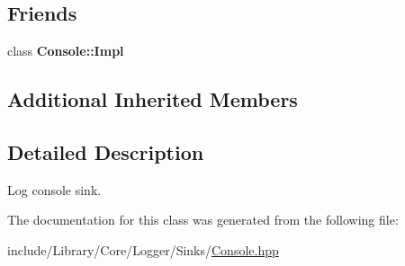 \subsection*{Friends}
\begin{DoxyCompactItemize}
\item 
\mbox{\label{classlibrary_1_1core_1_1logger_1_1sinks_1_1_console_aeda242f6bb74cf8f4003eb67666e9118}} 
class {\bfseries Console\+::\+Impl}
\end{DoxyCompactItemize}
\subsection*{Additional Inherited Members}


\subsection{Detailed Description}
Log console sink. 

The documentation for this class was generated from the following file\+:\begin{DoxyCompactItemize}
\item 
include/\+Library/\+Core/\+Logger/\+Sinks/\hyperlink{_console_8hpp}{Console.\+hpp}\end{DoxyCompactItemize}
